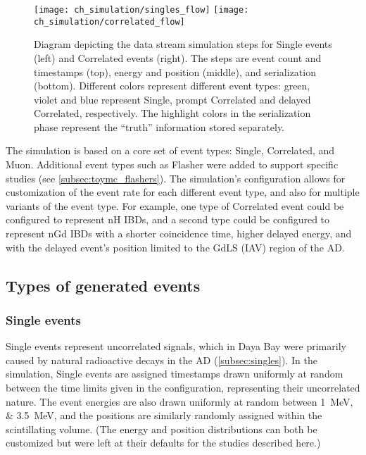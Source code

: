 \begin{figure}
    \centering
    \texttt{[image: ch\_simulation/singles\_flow]}
    \texttt{[image: ch\_simulation/correlated\_flow]}
    \caption[Data stream simulation diagram]{
        Diagram depicting the data stream simulation steps
        for Single events (left) and Correlated events (right).
        The steps are event count and timestamps (top),
        energy and position (middle), and serialization (bottom).
        Different colors represent different event types:
        green, violet and blue represent Single,
        prompt Correlated and delayed Correlated,
        respectively.
        The highlight colors in the serialization phase
        represent the ``truth'' information stored separately.
    }
    \label{fig:my_toymc_flowchart}
\end{figure}


The simulation is based on a core set of event types:
Single, Correlated, and Muon.
Additional event types such as Flasher were added to support specific studies
(see \cref{subsec:toymc_flashers}).
The simulation's configuration allows for customization of the event rate
for each different event type,
and also for multiple variants of the event type.
For example, one type of Correlated event could be configured to represent nH IBDs,
and a second type could be configured to represent nGd IBDs
with a shorter coincidence time, higher delayed energy,
and with the delayed event's position limited to the GdLS (IAV) region of the AD.

\subsection{Types of generated events}

\subsubsection{Single events}

Single events represent uncorrelated signals,
which in Daya Bay were primarily caused by natural radioactive decays in the AD
(\cref{subsec:singles}).
In the simulation, Single events are assigned timestamps
drawn uniformly at random between the time limits given in the configuration,
representing their uncorrelated nature.
The event energies are also drawn uniformly at random
between \SIlist{1;3.5}{\MeV},
and the positions are similarly randomly assigned
within the scintillating volume.
(The energy and position distributions can both be customized
but were left at their defaults for the studies described here.)

